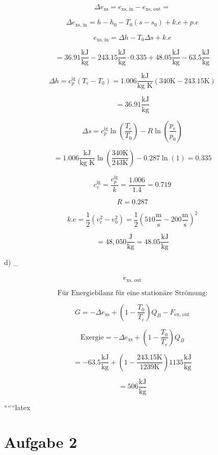 \[
\Delta e_{\text{xs}} = e_{\text{xs, in}} - e_{\text{xs, out}} = 
\]

\[
\Delta e_{\text{xs, in}} = h - h_0 - T_0 (s - s_0) + k.e + p.e
\]

\[
e_{\text{xs, in}} = \Delta h - T_0 \Delta s + k.e
\]

\[
= 36.91 \frac{\text{kJ}}{\text{kg}} - 243.15 \frac{\text{kJ}}{\text{kg}} \cdot 0.335 + 48.05 \frac{\text{kJ}}{\text{kg}} - 63.5 \frac{\text{kJ}}{\text{kg}}
\]

\[
\Delta h = c_p^{\text{ig}} (T_e - T_0) = 1.006 \frac{\text{kJ}}{\text{kg K}} (340 \text{K} - 243.15 \text{K})
\]

\[
= 36.91 \frac{\text{kJ}}{\text{kg}}
\]

\[
\Delta s = c_p^{\text{ig}} \ln \left( \frac{T_e}{T_0} \right) - R \ln \left( \frac{p_e}{p_0} \right)
\]

\[
= 1.006 \frac{\text{kJ}}{\text{kg K}} \ln \left( \frac{340 \text{K}}{243 \text{K}} \right) - 0.287 \ln (1) = 0.335
\]

\[
c_v^{\text{ig}} = \frac{c_p^{\text{ig}}}{k} = \frac{1.006}{1.4} = 0.719
\]

\[
R = 0.287
\]

\[
k.e = \frac{1}{2} (v_e^2 - v_0^2) = \frac{1}{2} (510 \frac{\text{m}}{\text{s}} - 200 \frac{\text{m}}{\text{s}})^2
\]

\[
= 48,050 \frac{\text{J}}{\text{kg}} = 48.05 \frac{\text{kJ}}{\text{kg}}
\]

d) \quad {}_{}

\[
\dot{e}_{\text{xs, out}}
\]

\[
\text{Für Energiebilanz für eine stationäre Strömung:}
\]

\[
G = -\Delta e_{\text{xs}} + \left( 1 - \frac{T_0}{T_e} \right) Q_B - F_{\text{ex, out}}
\]

\[
\text{Exergie} = -\Delta e_{\text{xs}} + \left( 1 - \frac{T_0}{T_e} \right) Q_B
\]

\[
= -63.5 \frac{\text{kJ}}{\text{kg}} + \left( 1 - \frac{243.15 \text{K}}{1239 \text{K}} \right) 1135 \frac{\text{kJ}}{\text{kg}}
\]

\[
= 506 \frac{\text{kJ}}{\text{kg}}
\]

``````latex


\section*{Aufgabe 2}

